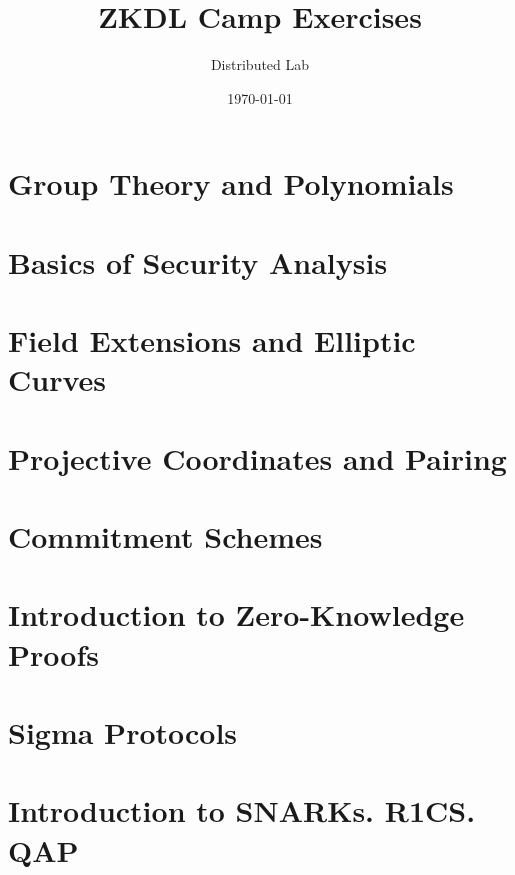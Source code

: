 \documentclass{zkdl-template}
\title{\huge\sffamily\bfseries ZKDL Camp Exercises}
\author{\Large\sffamily Distributed Lab}
\date{\sffamily \today}
\begin{document}
\pagestyle{fancy}

\maketitle

\pagebreak

\tableofcontents

\pagebreak

\section{Group Theory and Polynomials}



\section{Basics of Security Analysis}\label{section:math-crypto-2}



\section{Field Extensions and Elliptic Curves}



\section{Projective Coordinates and Pairing}



\section{Commitment Schemes}



\section{Introduction to Zero-Knowledge Proofs}



\section{Sigma Protocols}



\section{Introduction to SNARKs. R1CS. QAP}


\end{document}
